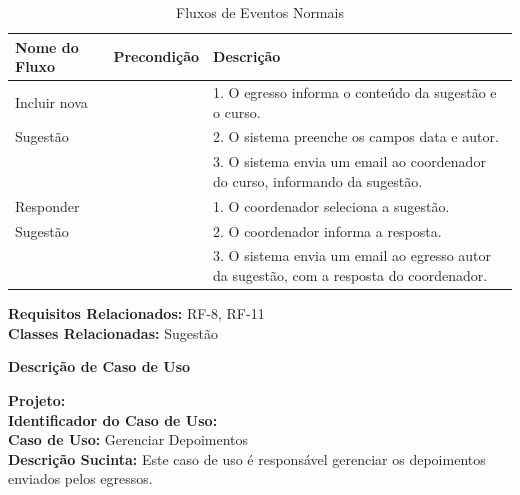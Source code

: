 \begin{table}[h]
	\centering 	\vspace{0.5cm} 	\footnotesize
	\caption{Fluxos de Eventos Normais}
	\begin{tabular}{|p{2.3cm}|p{1.8cm}|p{10.7cm}|} \hline  \rowcolor[rgb]{0.8,0.8,0.8}
 					
 		Nome do Fluxo & Precondição & Descrição  \\ \hline		
	
		Incluir nova  & {} & 1. O egresso informa o conteúdo da sugestão e o curso. \\ 
		Sugestão & {} & 2. O sistema preenche os campos data e autor. \\
		{} & {} & 3. O sistema envia um email ao coordenador do curso, informando da sugestão. \\ \hline
		
		Responder  & {} & 1. O coordenador seleciona a sugestão. \\ 
		Sugestão & {} & 2. O coordenador informa a resposta. \\
		{} & {} & 3. O sistema envia um email ao egresso autor da sugestão, com a resposta do coordenador. \\ \hline
				
	\end{tabular}	
\end{table}

\noindent  \textbf{Requisitos Relacionados:} RF-8, RF-11       \\ \textbf{Classes Relacionadas:} Sugestão










\newpage
\begin{flushright}    \textbf{Descrição de Caso de Uso}   \end{flushright} 
\noindent \textbf{Projeto:} \imprimirtitulo \\
\textbf{Identificador do Caso de Uso:} \UC\label{uc-depoimento}\\ 
\textbf{Caso de Uso:} Gerenciar Depoimentos \\
\noindent \textbf{Descrição Sucinta:} Este caso de uso é responsável gerenciar os depoimentos enviados pelos egressos.\\

